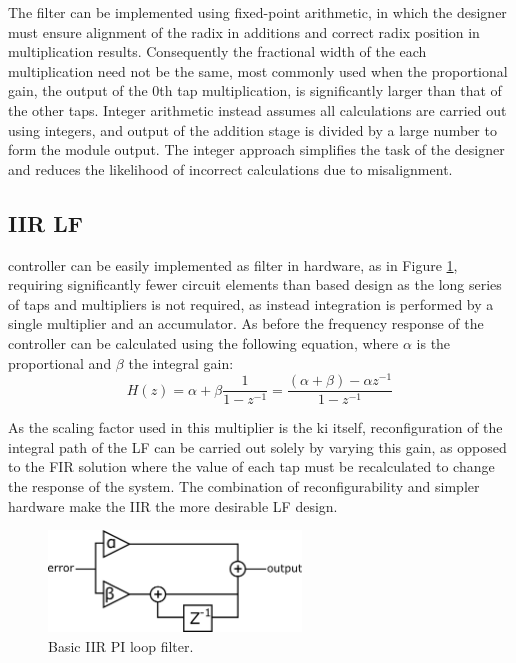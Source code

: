 The filter can be implemented using fixed-point arithmetic, in which the designer must ensure alignment of the radix in additions and correct radix position in multiplication results. Consequently the fractional width of the each multiplication need not be the same, most commonly used when the proportional gain, the output of the 0th tap multiplication, is significantly larger than that of the other taps. Integer arithmetic instead assumes all calculations are carried out using integers, and output of the addition stage is divided by a large number to form the module output. The integer approach simplifies the task of the designer and reduces the likelihood of incorrect calculations due to misalignment.

\subsection{\acs{IIR} \acl{LF}}
 controller can be easily implemented as  filter in hardware, as in Figure \ref{fig:iir_pi}, requiring significantly fewer circuit elements than  based design as the long series of taps and multipliers is not required, as instead integration is performed by a single multiplier and an accumulator. As before the frequency response of the controller can be calculated using the following equation, where $\alpha$ is the proportional and $\beta$ the integral gain:
\begin{equation*}
	H(z) = \alpha + \beta\frac{1}{1-z^{-1}} = \frac{(\alpha + \beta) - \alpha z^{-1}}{1-z^{-1}}
\end{equation*}

As the scaling factor used in this multiplier is the \ac{ki} itself, reconfiguration of the integral path of the \acl{LF} can be carried out solely by varying this gain, as opposed to the \ac{FIR} solution where the value of each tap must be recalculated to change the response of the system. The combination of reconfigurability and simpler hardware make the \ac{IIR} the more desirable \ac{LF} design.
\begin{figure}[h]
	\centering
	\includegraphics[width=0.6\textwidth]{../simple_pi.pdf}
	\caption[Basic \ac{IIR} \ac{PI} loop filter]{Basic \ac{IIR} \ac{PI} loop filter.}
	\label{fig:iir_pi}
\end{figure}

